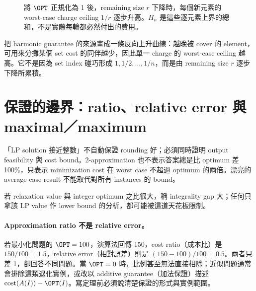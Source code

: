 \documentclass[11pt,a4paper,oneside,openany]{book}
\begin{document}
\begin{figure}[htbp]
\centering
{}
\caption{將 $\OPT$ 正規化為 1 後，remaining size $r$ 下降時，每個新元素的 worst-case charge ceiling $1/r$ 逐步升高。$H_n$ 是這些逐元素上界的總和，不是實際每輪都必然付出的費用。}
\label{fig:set-cover-harmonic}
\end{figure}

 把 harmonic guarantee 的來源畫成一條反向上升曲線：越晚被 cover 的 element，可用來分攤某個 set cost 的同伴越少，因此單一 charge 的 worst-case ceiling 越高。它不是因為 set index 碰巧形成 $1,1/2,\ldots,1/n$，而是由 remaining size $r$ 逐步下降所累積。

\section{保證的邊界：ratio、relative error 與 maximal／maximum}
\begin{misconception}
「LP solution 接近整數」不自動保證 rounding 好；必須同時證明 output feasibility 與 cost bound。2-approximation 也不表示答案總是比 optimum 差 100\%，只表示 minimization cost 在 worst case 不超過 optimum 的兩倍。漂亮的 average-case result 不能取代對所有 instances 的 bound。
\end{misconception}
若 relaxation value 與 integer optimum 之比很大，稱 integrality gap 大；任何只拿該 LP value 作 lower bound 的分析，都可能被這道天花板限制。

\paragraph{Approximation ratio 不是 relative error。}
若最小化問題的 $\OPT=100$，演算法回傳 150，cost ratio（成本比）是 $150/100=1.5$，relative error（相對誤差）則是 $(150-100)/100=0.5$。兩者只差 1，卻回答不同問題。當 $\OPT=0$ 時，比例甚至無法直接相除；近似問題通常會排除這類退化實例，或改以 additive guarantee（加法保證）描述 $\mathrm{cost}(A(I))-\OPT(I)$。寫定理前必須說清楚保證的形式與實例範圍。
\end{document}
